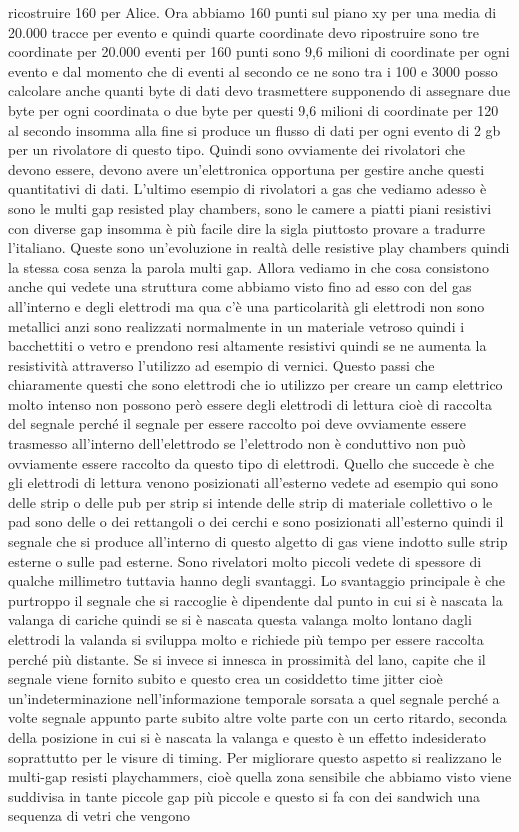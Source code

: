 ricostruire 160 per Alice. Ora abbiamo 160 punti sul piano xy per una media di 20.000 tracce per evento e quindi quarte coordinate devo ripostruire sono tre coordinate per 20.000 eventi per 160 punti sono 9,6 milioni di coordinate per ogni evento e dal momento che di eventi al secondo ce ne sono tra i 100 e 3000 posso calcolare anche quanti byte di dati devo trasmettere supponendo di assegnare due byte per ogni coordinata o due byte per questi 9,6 milioni di coordinate per 120 al secondo insomma alla fine si produce un flusso di dati per ogni evento di 2 gb per un rivolatore di questo tipo. Quindi sono ovviamente dei rivolatori che devono essere, devono avere un'elettronica opportuna per gestire anche questi quantitativi di dati. L'ultimo esempio di rivolatori a gas che vediamo adesso è sono le multi gap resisted play chambers, sono le camere a piatti piani resistivi con diverse gap insomma è più facile dire la sigla piuttosto provare a tradurre l'italiano. Queste sono un'evoluzione in realtà delle resistive play chambers quindi la stessa cosa senza la parola multi gap. Allora vediamo in che cosa consistono anche qui vedete una struttura come abbiamo visto fino ad esso con del gas all'interno e degli elettrodi ma qua c'è una particolarità gli elettrodi non sono metallici anzi sono realizzati normalmente in un materiale vetroso quindi i bacchettiti o vetro e prendono resi altamente resistivi quindi se ne aumenta la resistività attraverso l'utilizzo ad esempio di vernici. Questo passi che chiaramente questi che sono elettrodi che io utilizzo per creare un camp elettrico molto intenso non possono però essere degli elettrodi di lettura cioè di raccolta del segnale perché il segnale per essere raccolto poi deve ovviamente essere trasmesso all'interno dell'elettrodo se l'elettrodo non è conduttivo non può ovviamente essere raccolto da questo tipo di elettrodi. Quello che succede è che gli elettrodi di lettura venono posizionati all'esterno vedete ad esempio qui sono delle strip o delle pub per strip si intende delle strip di materiale collettivo o le pad sono delle o dei rettangoli o dei cerchi e sono posizionati all'esterno quindi il segnale che si produce all'interno di questo algetto di gas viene indotto sulle strip esterne o sulle pad esterne. Sono rivelatori molto piccoli vedete di spessore di qualche millimetro tuttavia hanno degli svantaggi. Lo svantaggio principale è che purtroppo il segnale che si raccoglie è dipendente dal punto in cui si è nascata la valanga di cariche quindi se si è nascata questa valanga molto lontano dagli elettrodi la valanda si sviluppa molto e richiede più tempo per essere raccolta perché più distante. Se si invece si innesca in prossimità del lano, capite che il segnale viene fornito subito e questo crea un cosiddetto time jitter cioè un'indeterminazione nell'informazione temporale sorsata a quel segnale perché a volte segnale appunto parte subito altre volte parte con un certo ritardo, seconda della posizione in cui si è nascata la valanga e questo è un effetto indesiderato soprattutto per le visure di timing. Per migliorare questo aspetto si realizzano le multi-gap resisti playchammers, cioè quella zona sensibile che abbiamo visto viene suddivisa in tante piccole gap più piccole e questo si fa con dei sandwich una sequenza di vetri che vengono 